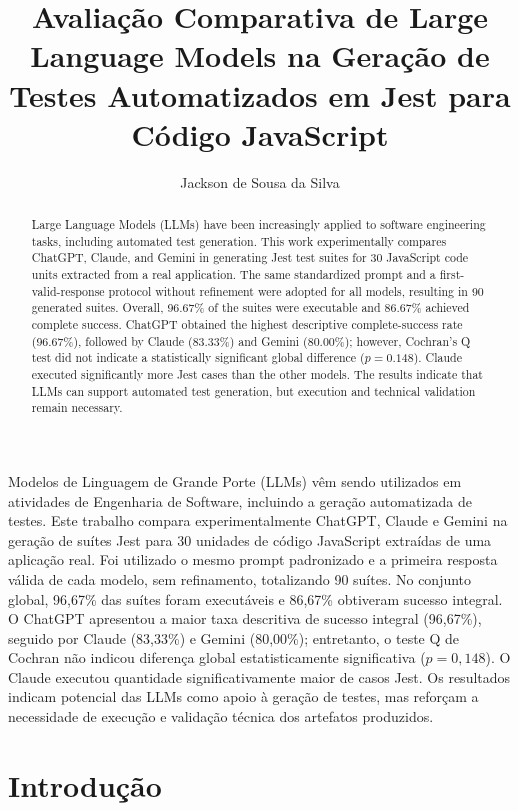 \documentclass[12pt]{article}
\title{Avaliação Comparativa de Large Language Models na Geração de Testes Automatizados em Jest para Código JavaScript}
\author{Jackson de Sousa da Silva\inst{1}}
\begin{document}
\maketitle

\begin{abstract}
Large Language Models (LLMs) have been increasingly applied to software engineering tasks, including automated test generation. This work experimentally compares ChatGPT, Claude, and Gemini in generating Jest test suites for 30 JavaScript code units extracted from a real application. The same standardized prompt and a first-valid-response protocol without refinement were adopted for all models, resulting in 90 generated suites. Overall, 96.67\% of the suites were executable and 86.67\% achieved complete success. ChatGPT obtained the highest descriptive complete-success rate (96.67\%), followed by Claude (83.33\%) and Gemini (80.00\%); however, Cochran's Q test did not indicate a statistically significant global difference ($p=0.148$). Claude executed significantly more Jest cases than the other models. The results indicate that LLMs can support automated test generation, but execution and technical validation remain necessary.
\end{abstract}

\begin{resumo}
Modelos de Linguagem de Grande Porte (LLMs) vêm sendo utilizados em atividades de Engenharia de Software, incluindo a geração automatizada de testes. Este trabalho compara experimentalmente ChatGPT, Claude e Gemini na geração de suítes Jest para 30 unidades de código JavaScript extraídas de uma aplicação real. Foi utilizado o mesmo prompt padronizado e a primeira resposta válida de cada modelo, sem refinamento, totalizando 90 suítes. No conjunto global, 96,67\% das suítes foram executáveis e 86,67\% obtiveram sucesso integral. O ChatGPT apresentou a maior taxa descritiva de sucesso integral (96,67\%), seguido por Claude (83,33\%) e Gemini (80,00\%); entretanto, o teste Q de Cochran não indicou diferença global estatisticamente significativa ($p=0,148$). O Claude executou quantidade significativamente maior de casos Jest. Os resultados indicam potencial das LLMs como apoio à geração de testes, mas reforçam a necessidade de execução e validação técnica dos artefatos produzidos.
\end{resumo}

\section{Introdução}
\end{document}
